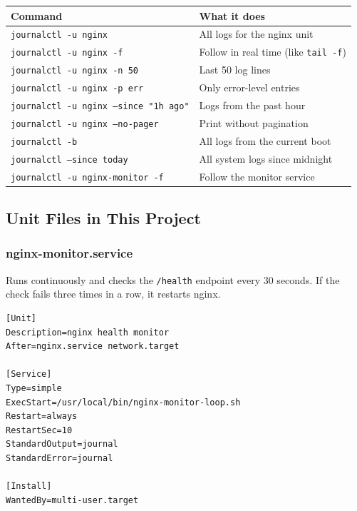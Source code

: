 \documentclass[11pt,a4paper]{article}
\begin{document}
\begin{center}
\begin{tabular}{L{6.5cm}L{7cm}}
\toprule
\textbf{Command} & \textbf{What it does} \\
\midrule
\texttt{journalctl -u nginx}                 & All logs for the nginx unit \\
\texttt{journalctl -u nginx -f}              & Follow in real time (like \texttt{tail -f}) \\
\texttt{journalctl -u nginx -n 50}           & Last 50 log lines \\
\texttt{journalctl -u nginx -p err}          & Only error-level entries \\
\texttt{journalctl -u nginx --since "1h ago"} & Logs from the past hour \\
\texttt{journalctl -u nginx --no-pager}      & Print without pagination \\
\texttt{journalctl -b}                       & All logs from the current boot \\
\texttt{journalctl --since today}            & All system logs since midnight \\
\texttt{journalctl -u nginx-monitor -f}      & Follow the monitor service \\
\bottomrule
\end{tabular}
\end{center}

\subsection{Unit Files in This Project}

\subsubsection{nginx-monitor.service}

Runs continuously and checks the \texttt{/health} endpoint every 30 seconds. If the check fails three times in a row, it restarts nginx.

\begin{lstlisting}[caption={systemd/nginx-monitor.service}]
[Unit]
Description=nginx health monitor
After=nginx.service network.target

[Service]
Type=simple
ExecStart=/usr/local/bin/nginx-monitor-loop.sh
Restart=always
RestartSec=10
StandardOutput=journal
StandardError=journal

[Install]
WantedBy=multi-user.target
\end{lstlisting}
\end{document}
